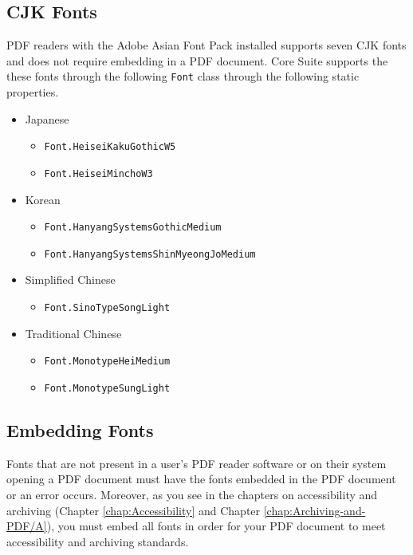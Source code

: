\documentclass[american]{tufte-book}
\numberwithin{equation}{section}
\numberwithin{figure}{section}
\begin{document}
{\subsection{CJK Fonts}

PDF readers with the Adobe Asian Font Pack installed supports seven
CJK fonts and does not require embedding in a PDF document. Core Suite
supports the these fonts through the following \texttt{Font} class
through the following static properties.
\begin{itemize}
\item Japanese
\begin{itemize}
\item \texttt{Font.HeiseiKakuGothicW5}
\item \texttt{Font.HeiseiMinchoW3}
\end{itemize}
\item Korean
\begin{itemize}
\item \texttt{Font.HanyangSystemsGothicMedium}
\item \texttt{Font.HanyangSystemsShinMyeongJoMedium}
\end{itemize}
\item Simplified Chinese
\begin{itemize}
\item \texttt{Font.SinoTypeSongLight}
\end{itemize}
\item Traditional Chinese
\begin{itemize}
\item \texttt{Font.MonotypeHeiMedium}
\item \texttt{Font.MonotypeSungLight}
\end{itemize}
\end{itemize}

\subsection{Embedding Fonts}

Fonts that are not present in a user's PDF reader software or on their
system opening a PDF document must have the fonts embedded in the
PDF document or an error occurs. Moreover, as you see in the chapters
on accessibility and archiving (Chapter \ref{chap:Accessibility}
and Chapter \ref{chap:Archiving-and-PDF/A}), you must embed all fonts
in order for your PDF document to meet accessibility and archiving
standards.

}
\end{document}
